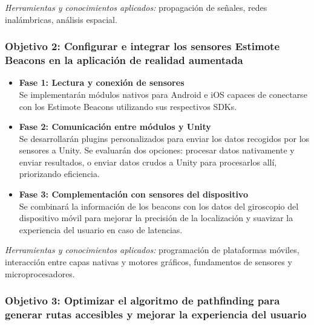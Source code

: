 \documentclass{article}
\begin{document}
\textit{Herramientas y conocimientos aplicados:} propagación de señales, redes inalámbricas, análisis espacial.

\subsubsection{Objetivo 2: Configurar e integrar los sensores Estimote Beacons en la aplicación de realidad aumentada}

\begin{itemize}
    \item \textbf{Fase 1: Lectura y conexión de sensores} \\
    Se implementarán módulos nativos para Android e iOS capaces de conectarse con los Estimote Beacons utilizando sus respectivos SDKs.

    \item \textbf{Fase 2: Comunicación entre módulos y Unity} \\
    Se desarrollarán plugins personalizados para enviar los datos recogidos por los sensores a Unity. Se evaluarán dos opciones: procesar datos nativamente y enviar resultados, o enviar datos crudos a Unity para procesarlos allí, priorizando eficiencia.

    \item \textbf{Fase 3: Complementación con sensores del dispositivo} \\
    Se combinará la información de los beacons con los datos del giroscopio del dispositivo móvil para mejorar la precisión de la localización y suavizar la experiencia del usuario en caso de latencias.
\end{itemize}

\textit{Herramientas y conocimientos aplicados:} programación de plataformas móviles, interacción entre capas nativas y motores gráficos, fundamentos de sensores y microprocesadores.

\subsubsection{Objetivo 3: Optimizar el algoritmo de pathfinding para generar rutas accesibles y mejorar la experiencia del usuario}
\end{document}
